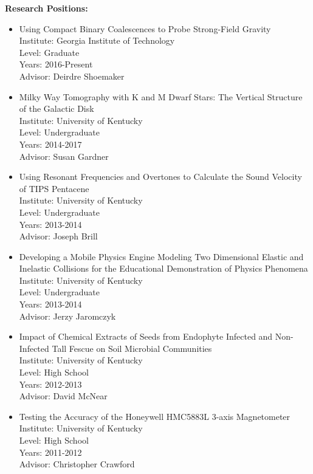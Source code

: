 \documentclass[11pt]{article}
\begin{document}
\begin{flushleft}
  \textbf{Research Positions:}
  \begin{itemize}
  \item Using Compact Binary Coalescences to Probe Strong-Field Gravity \\
    Institute: Georgia Institute of Technology \\
    Level: Graduate \\
    Years: 2016-Present \\
    Advisor: Deirdre Shoemaker 
  \item Milky Way Tomography with K and M Dwarf Stars: The Vertical Structure of the Galactic Disk \\
    Institute: University of Kentucky \\
    Level: Undergraduate \\
    Years: 2014-2017 \\
    Advisor: Susan Gardner
  \item Using Resonant Frequencies and Overtones to Calculate the Sound Velocity of TIPS Pentacene \\
    Institute: University of Kentucky \\
    Level: Undergraduate \\
    Years: 2013-2014 \\
    Advisor: Joseph Brill
  \item Developing a Mobile Physics Engine Modeling Two Dimensional Elastic and Inelastic Collisions for the Educational Demonstration of Physics Phenomena \\
    Institute: University of Kentucky \\
    Level: Undergraduate \\
    Years: 2013-2014 \\
    Advisor: Jerzy Jaromczyk 
  \item Impact of Chemical Extracts of Seeds from Endophyte Infected and Non-Infected Tall Fescue on Soil Microbial Communities \\
    Institute: University of Kentucky \\
    Level: High School \\
    Years: 2012-2013 \\
    Advisor: David McNear
  \item Testing the Accuracy of the Honeywell HMC5883L 3-axis Magnetometer \\
    Institute: University of Kentucky \\
    Level: High School \\
    Years: 2011-2012 \\
    Advisor: Christopher Crawford
  \end{itemize}


\end{flushleft}
\end{document}
